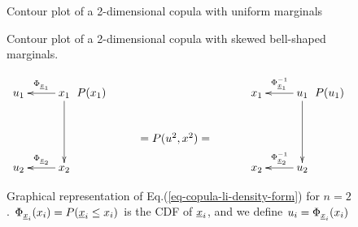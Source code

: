 \begin{figure}[!h]
\begin{floatrow}
 {\caption{Contour plot of a 2-dimensional copula
 with uniform marginals}
 \label{fig-copula1}}
 {\caption{Contour plot of a 2-dimensional copula
 with skewed bell-shaped marginals.}
 \label{fig-copula2}}
\end{floatrow}
\end{figure}





\begin{figure}[h!]
$$
\xymatrix{
u_1
&x_1\ar[l]_{\Phi_{\rvx_1}}\ar[dd]
\\
\\
u_2
&x_2\ar[l]_{\Phi_{\rvx_2}}
}
\xymatrix{P(x_1)
\\
&=P(u^2, x^2)=&}
\xymatrix{
x_1
&u_1\ar[l]_{\Phi_{\rvx_1}^{-1}}
\ar[dd]
\\
\\
x_2
&u_2\ar[l]_{\Phi_{\rvx_2}^{-1}}
}
\xymatrix{P(u_1)
\\}
$$
\caption{Graphical representation
of Eq.(\ref{eq-copula-li-density-form}) for $n=2$.
$\Phi_{
{\underline{x}}_i}(x_i) = P({\underline{x}}_i\leq x_i)$
is the CDF of ${\underline{x}}_i$,
and we define
$u_i = \Phi_{{\underline{x}}_i}(x_i)$}
\label{fig-copula-li-bnet}
\end{figure}

